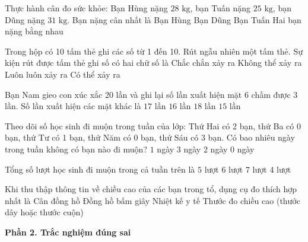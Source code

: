 \begin{ex} %
Thực hành cân đo sức khỏe: Bạn Hùng nặng $28\text{ kg}$, bạn Tuấn nặng $25\text{ kg}$, bạn Dũng nặng $31\text{ kg}$. Bạn nặng cân nhất là
\choice
{Bạn Hùng}
{\True Bạn Dũng}
{Bạn Tuấn}
{Hai bạn nặng bằng nhau}
\end{ex}

\begin{ex} %
Trong hộp có 10 tấm thẻ ghi các số từ 1 đến 10. Rút ngẫu nhiên một tấm thẻ. Sự kiện rút được tấm thẻ ghi số có hai chữ số là
\choice
{Chắc chắn xảy ra}
{Không thể xảy ra}
{Luôn luôn xảy ra}
{\True Có thể xảy ra}
\end{ex}

\begin{ex} %
Bạn Nam gieo con xúc xắc 20 lần và ghi lại số lần xuất hiện mặt 6 chấm được 3 lần. Số lần xuất hiện các mặt khác là
\choice
{\True $17$ lần}
{$16$ lần}
{$18$ lần}
{$15$ lần}
\end{ex}

\begin{ex} %
Theo dõi số học sinh đi muộn trong tuần của lớp: Thứ Hai có 2 bạn, thứ Ba có 0 bạn, thứ Tư có 1 bạn, thứ Năm có 0 bạn, thứ Sáu có 3 bạn. Có bao nhiêu ngày trong tuần không có bạn nào đi muộn?
\choice
{$1$ ngày}
{$3$ ngày}
{\True $2$ ngày}
{$0$ ngày}
\end{ex}

\begin{ex} %
Tổng số lượt học sinh đi muộn trong cả tuần trên là
\choice
{$5$ lượt}
{\True $6$ lượt}
{$7$ lượt}
{$4$ lượt}
\end{ex}

\begin{ex} %
Khi thu thập thông tin về chiều cao của các bạn trong tổ, dụng cụ đo thích hợp nhất là
\choice
{Cân đồng hồ}
{Đồng hồ bấm giây}
{Nhiệt kế y tế}
{\True Thước đo chiều cao (thước dây hoặc thước cuộn)}
\end{ex}

\textbf{Phần 2. Trắc nghiệm đúng sai}

